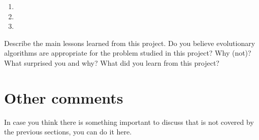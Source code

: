 \documentclass[a4paper,10pt]{article}
\newcommand{\ReplaceMe}[1]{{\color{blue}#1}}
\begin{document}
\begin{enumerate}
 \item 
 \item 
 \item 
\end{enumerate}

\ReplaceMe{Describe the main lessons learned from this project. Do you believe evolutionary algorithms are appropriate for the problem studied in this project? Why (not)? What surprised you and why? What did you learn from this project?}

\section{Other comments} \label{sec_other}

\ReplaceMe{In case you think there is something important to discuss that is not covered by the previous sections, you can do it here. }



\end{document}

